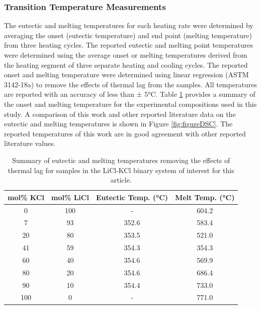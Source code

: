 \documentclass[review]{elsarticle}
\begin{document}
\FloatBarrier

\subsubsection{Transition Temperature Measurements}

The eutectic and melting temperatures for each heating rate were determined by averaging the onset (eutectic temperature) and end point (melting temperature) from three heating cycles. The reported eutectic and melting point temperatures were determined using the average onset or melting temperatures derived from the heating segment of three separate heating and cooling cycles. The reported onset and melting temperature were determined using linear regression (ASTM 3142-18a) to remove the effects of thermal lag from the samples. All temperatures are reported with an accuracy of less than ± 5°C. Table \ref{tableDSC} provides a summary of the onset and melting temperature for the experimental compositions used in this study. A comparison of this work and other reported literature data on the eutectic and melting temperatures is shown in Figure \ref{fig:figureDSC}. The reported temperatures of this work are in good agreement with other reported literature values. 

\begin{table}[h]
\centering
\caption{Summary of eutectic and melting temperatures removing the effects of thermal lag for samples in the LiCl-KCl binary system of interest for this article.}
\begin{tabular}{|c|c|c|c|}
\hline
mol\% KCl & mol\% LiCl & Eutectic Temp. (°C) & Melt Temp. (°C)\\
\hline
0       & 100        & -            & 604.2 \\
7       & 93         & 352.6        & 583.4 \\
20      & 80         & 353.5        & 521.0 \\
41      & 59         & 354.3        & 354.3 \\
60      & 40         & 354.6        & 569.9 \\
80      & 20         & 354.6        & 686.4 \\
90      & 10         & 354.4        & 733.0 \\
100     & 0          & -            & 771.0 \\
\hline
\end{tabular}
\label{tableDSC}
\end{table}
\end{document}
